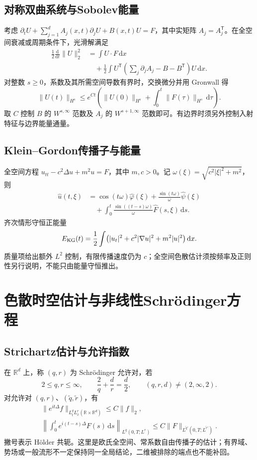 \documentclass[../main.tex]{subfiles}
\begin{document}
\subsection{对称双曲系统与Sobolev能量}
考虑 $\partial_tU+\sum_{j=1}^dA_j(x,t)\partial_jU+B(x,t)U=F$，其中实矩阵 $A_j=A_j^{\mathsf T}$。在全空间衰减或周期条件下，光滑解满足
\begin{align*}
\frac12\frac{\mathrm d}{\mathrm dt}\|U\|_2^2
&=\int U\cdot F\,\mathrm dx\\
&\quad+\frac12\int U^{\mathsf T}
\left(\sum_j\partial_jA_j-B-B^{\mathsf T}\right)U\,\mathrm dx.
\end{align*}
对整数 $s\ge0$，系数及其所需空间导数有界时，交换微分并用 Gronwall 得
\[
\|U(t)\|_{H^s}\le e^{Ct}
\left(\|U(0)\|_{H^s}+\int_0^t\|F(\tau)\|_{H^s}\,\mathrm d\tau\right).
\]
取 $C$ 控制 $B$ 的 $W^{s,\infty}$ 范数及 $A_j$ 的 $W^{s+1,\infty}$ 范数即可。有边界时须另外控制入射特征与边界能量通量。
\subsection{Klein--Gordon传播子与能量}
全空间方程 $u_{tt}-c^2\Delta u+m^2u=F$，其中 $m,c>0$。记 $\omega(\xi)=\sqrt{c^2|\xi|^2+m^2}$，则
\begin{align*}
\widehat u(t,\xi)&=\cos(t\omega)\widehat\varphi(\xi)
+\frac{\sin(t\omega)}{\omega}\widehat\psi(\xi)\\
&\quad+\int_0^t\frac{\sin((t-s)\omega)}{\omega}\widehat F(s,\xi)\,\mathrm ds.
\end{align*}
齐次情形守恒正能量
\[
E_{\rm KG}(t)=\frac12\int\bigl(|u_t|^2+c^2|\nabla u|^2+m^2|u|^2\bigr)\,\mathrm dx.
\]
质量项给出额外 $L^2$ 控制，有限传播速度仍为 $c$；全空间色散估计须按频率及正则性另行说明，不能只由能量守恒推出。

\section{色散时空估计与非线性Schrödinger方程}
\subsection{Strichartz估计与允许指数}
在 $\mathbb R^d$ 上，称 $(q,r)$ 为 Schrödinger 允许对，若
\[
2\le q,r\le\infty,\qquad\frac2q+\frac dr=\frac d2,\qquad
(q,r,d)\ne(2,\infty,2).
\]
对允许对 $(q,r)$、$(\widetilde q,\widetilde r)$，有
\begin{gather*}
\|e^{it\Delta}f\|_{L_t^qL_x^r(\mathbb R\times\mathbb R^d)}\le C\|f\|_2,\\
\left\|\int_0^te^{i(t-s)\Delta}F(s)\,\mathrm ds\right\|_{L^q(0,T;L^r)}
\le C\|F\|_{L^{\widetilde q'}(0,T;L^{\widetilde r'})}.
\end{gather*}
撇号表示 Hölder 共轭。这里是欧氏全空间、常系数自由传播子的估计；有界域、势场或一般流形不一定保持同一全局结论，二维被排除的端点也不能补回。
\end{document}

